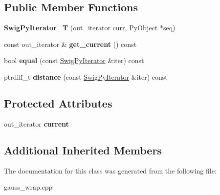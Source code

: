 \subsection*{Public Member Functions}
\begin{DoxyCompactItemize}
\item 
\hypertarget{classswig_1_1_swig_py_iterator___t_aed627e359856103f6e9b2e939fc85d9c}{{\bfseries Swig\-Py\-Iterator\-\_\-\-T} (out\-\_\-iterator curr, Py\-Object $\ast$seq)}\label{classswig_1_1_swig_py_iterator___t_aed627e359856103f6e9b2e939fc85d9c}

\item 
\hypertarget{classswig_1_1_swig_py_iterator___t_ab452f2d0e15c0dd2757014231d16b4a9}{const out\-\_\-iterator \& {\bfseries get\-\_\-current} () const }\label{classswig_1_1_swig_py_iterator___t_ab452f2d0e15c0dd2757014231d16b4a9}

\item 
\hypertarget{classswig_1_1_swig_py_iterator___t_ae50a7b89fee4c738d0cf7e9286fecddf}{bool {\bfseries equal} (const \hyperlink{structswig_1_1_swig_py_iterator}{Swig\-Py\-Iterator} \&iter) const }\label{classswig_1_1_swig_py_iterator___t_ae50a7b89fee4c738d0cf7e9286fecddf}

\item 
\hypertarget{classswig_1_1_swig_py_iterator___t_a8c5d44ceb861ce9124c69ca6a1ff1a55}{ptrdiff\-\_\-t {\bfseries distance} (const \hyperlink{structswig_1_1_swig_py_iterator}{Swig\-Py\-Iterator} \&iter) const }\label{classswig_1_1_swig_py_iterator___t_a8c5d44ceb861ce9124c69ca6a1ff1a55}

\end{DoxyCompactItemize}
\subsection*{Protected Attributes}
\begin{DoxyCompactItemize}
\item 
\hypertarget{classswig_1_1_swig_py_iterator___t_a7b69908f19b9150a4d2b357567f8bd82}{out\-\_\-iterator {\bfseries current}}\label{classswig_1_1_swig_py_iterator___t_a7b69908f19b9150a4d2b357567f8bd82}

\end{DoxyCompactItemize}
\subsection*{Additional Inherited Members}


The documentation for this class was generated from the following file\-:\begin{DoxyCompactItemize}
\item 
gauss\-\_\-wrap.\-cpp\end{DoxyCompactItemize}
